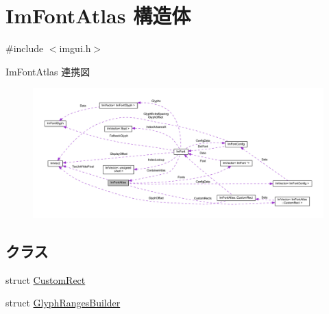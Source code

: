 \hypertarget{struct_im_font_atlas}{}\section{Im\+Font\+Atlas 構造体}
\label{struct_im_font_atlas}


{\ttfamily \#include $<$imgui.\+h$>$}



Im\+Font\+Atlas 連携図\nopagebreak
\begin{figure}[H]
\begin{center}
\leavevmode
\includegraphics[width=350pt]{struct_im_font_atlas__coll__graph}
\end{center}
\end{figure}
\subsection*{クラス}
\begin{DoxyCompactItemize}
\item 
struct \mbox{\hyperlink{struct_im_font_atlas_1_1_custom_rect}{Custom\+Rect}}
\item 
struct \mbox{\hyperlink{struct_im_font_atlas_1_1_glyph_ranges_builder}{Glyph\+Ranges\+Builder}}
\end{DoxyCompactItemize}
